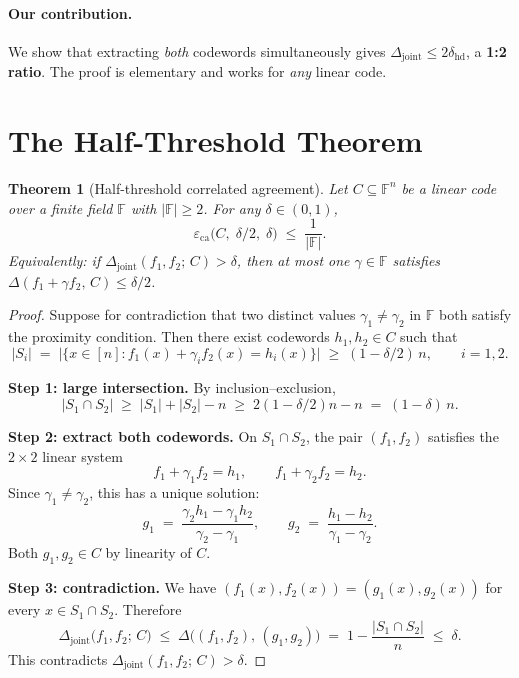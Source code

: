 \documentclass[11pt]{article}
\newtheorem{theorem}{Theorem}
\newcommand{\FF}{\mathbb{F}}
\newcommand{\ca}{\varepsilon_{\mathrm{ca}}}
\newcommand{\dist}{\Delta}
\begin{document}
\paragraph{Our contribution.}
We show that extracting \emph{both} codewords simultaneously gives
$\dist_{\mathrm{joint}} \le 2\delta_{\mathrm{hd}}$, a \textbf{1:2 ratio}.
The proof is elementary and works for \emph{any} linear code.

\section{The Half-Threshold Theorem}

\begin{theorem}[Half-threshold correlated agreement]\label{thm:main}
Let $C \subseteq \FF^n$ be a linear code over a finite field $\FF$ with
$|\FF| \ge 2$.  For any $\delta \in (0,1)$,
\[
  \ca\!\bigl(C,\;\delta/2,\;\delta\bigr)
  \;\le\; \frac{1}{|\FF|}.
\]
Equivalently: if\/ $\dist_{\mathrm{joint}}(f_1,f_2;\,C) > \delta$, then
at most one $\gamma \in \FF$ satisfies
$\dist(f_1 + \gamma f_2,\,C) \le \delta/2$.
\end{theorem}

\begin{proof}
Suppose for contradiction that two distinct values
$\gamma_1 \ne \gamma_2$ in $\FF$ both satisfy the proximity condition.
Then there exist codewords $h_1, h_2 \in C$ such that
\[
  |S_i| \;=\; \bigl|\{x \in [n] : f_1(x) + \gamma_i f_2(x) = h_i(x)\}\bigr|
  \;\ge\; (1 - \delta/2)\,n,
  \qquad i = 1,2.
\]

\medskip\noindent\textbf{Step 1: large intersection.}\;
By inclusion--exclusion,
\[
  |S_1 \cap S_2|
  \;\ge\; |S_1| + |S_2| - n
  \;\ge\; 2(1-\delta/2)n - n
  \;=\; (1 - \delta)\,n.
\]

\medskip\noindent\textbf{Step 2: extract both codewords.}\;
On $S_1 \cap S_2$, the pair $(f_1, f_2)$ satisfies the $2 \times 2$
linear system
\[
  f_1 + \gamma_1 f_2 = h_1,
  \qquad
  f_1 + \gamma_2 f_2 = h_2.
\]
Since $\gamma_1 \ne \gamma_2$, this has a unique solution:
\[
  g_1 \;=\; \frac{\gamma_2 h_1 - \gamma_1 h_2}{\gamma_2 - \gamma_1},
  \qquad
  g_2 \;=\; \frac{h_1 - h_2}{\gamma_1 - \gamma_2}.
\]
Both $g_1, g_2 \in C$ by linearity of $C$.

\medskip\noindent\textbf{Step 3: contradiction.}\;
We have $(f_1(x), f_2(x)) = (g_1(x), g_2(x))$ for every
$x \in S_1 \cap S_2$.  Therefore
\[
  \dist_{\mathrm{joint}}\bigl(f_1,f_2;\,C\bigr)
  \;\le\; \dist\bigl((f_1,f_2),\,(g_1,g_2)\bigr)
  \;=\; 1 - \frac{|S_1 \cap S_2|}{n}
  \;\le\; \delta.
\]
This contradicts $\dist_{\mathrm{joint}}(f_1,f_2;\,C) > \delta$.
\end{proof}
\end{document}
